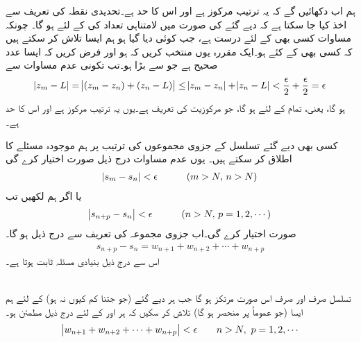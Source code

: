 ہم اب دکھائیں گے کہ یہ ترتیب مرکوز ہے اور اس کا حد  ہے۔تحدیدی نقطہ کی تعریف سے اخذ کیا جا سکتا ہے کہ دیے گئے  کی صورت میں لامتناہی تعداد کی  کے لئے  ہو گا۔ چونکہ مساوات  کسی بھی  کے لئے درست ہے، جب کوئی  دیا گیا ہو ہم ایسا  تلاش کر سکتے ہیں کہ کسی بھی  کے کئے 
 ہو۔ایک مقررہ  یوں منتخب کریں کہ  ہو اور فرض کریں کہ  ایسا عدد صحیح ہے جو  سے بڑا ہو۔تب تکونی عدم مساوات سے
\begin{align*}
\abs{z_m-L}=\abs{(z_m-z_n)+(z_n-L)}\le \abs{z_m-z_n}+\abs{z_n-L}<\frac{\epsilon}{2}+\frac{\epsilon}{2}=\epsilon
\end{align*}
ہو گا، یعنی، تمام  کے لئے  ہو گا، جو مرکوزیت کی تعریف ہے۔یوں یہ ترتیب مرکوز ہے اور اس کا حد  ہے۔

کسی بھی دیے گئے تسلسل  کے جزوی مجموعوں  کی ترتیب پر ہم موجودہ مسئلے کا اطلاق کر سکتے ہیں۔ یوں عدم مساوات  درج ذیل صورت اختیار کرے گی
\begin{align*}
\abs{s_m-s_n}<\epsilon\quad \quad \quad (m>N,\,n>N)
\end{align*}
یا اگر ہم  لکھیں تب 
\begin{align*}
\abs{s_{n+p}-s_n}<\epsilon\quad \quad \quad (n>N,\,p=1,2,\cdots)
\end{align*}
صورت اختیار کرے گی۔اب جزوی مجموعہ کی تعریف سے درج ذیل ہو گا۔
\begin{align*}
s_{n+p}-s_n=w_{n+1}+w_{n+2}+\cdots+w_{n+p}
\end{align*}
اس سے درج ذیل بنیادی مسئلہ ثابت ہوتا ہے۔

\quad {}\\
تسلسل  صرف اور صرف اس صورت مرتکز ہو گا جب ہر دیے گئے  (جو جتنا کم کیوں نہ ہو) کے لئے ہم ایسا  (جو عموماً  پر منحصر ہو گا) تلاش کر سکیں کہ ہر  اور  کے لئے درج ذیل مطمئن ہو۔
\begin{align*}
\abs{w_{n+1}+w_{n+2}+\cdots+w_{n+p}}<\epsilon \quad \quad n>N,\,\, p=1,2,\cdots 
\end{align*}


